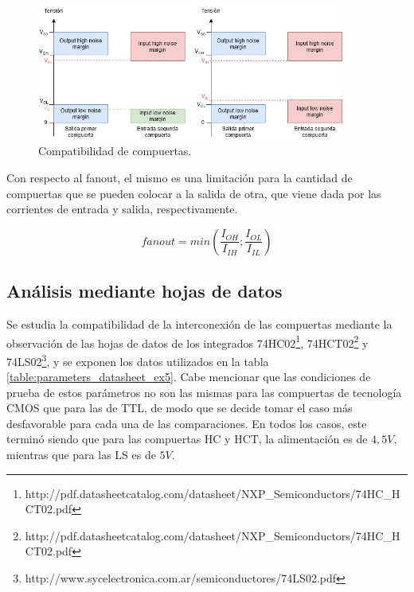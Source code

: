 \begin{figure}[H]
    \centering
    \includegraphics[width=0.9\textwidth]{../EJ2/Recursos/incompatible_gates}
    \caption{Compatibilidad de compuertas.}
    \label{fig:compatible_v_non_compatible_2_ex5}
\end{figure}

Con respecto al fanout, el mismo es una limitación para la cantidad de compuertas que se pueden colocar a la salida de otra, que viene dada por las corrientes de entrada 
y salida, respectivamente.

\begin{equation}
    fanout = min\left(\frac{I_{OH}}{I_{IH}} ; \frac{I_{OL}}{I_{IL}}\right)
\end{equation}



\subsection{Análisis mediante hojas de datos}
Se estudia la compatibilidad de la interconexión de las compuertas mediante la observación de las hojas de datos de los integrados 
74HC02\footnote{http://pdf.datasheetcatalog.com/datasheet/NXP\_Semiconductors/74HC\_HCT02.pdf}, 74HCT02\footnote{http://pdf.datasheetcatalog.com/datasheet/NXP\_Semiconductors/74HC\_HCT02.pdf} y 74LS02\footnote{http://www.sycelectronica.com.ar/semiconductores/74LS02.pdf},
y se exponen los datos utilizados en la tabla \ref{table:parameters_datasheet_ex5}.
Cabe mencionar que las condiciones de prueba de estos parámetros no son las mismas para las compuertas de tecnología CMOS que para las de TTL, de modo que se decide tomar 
el caso más desfavorable para cada una de las comparaciones.
En todos los casos, este terminó siendo que para las compuertas HC y HCT, la alimentación es de $4,5 V$, mientras que para las LS es de $5 V$.

